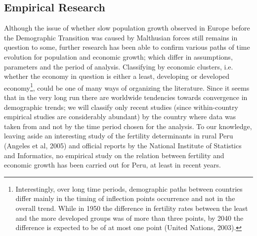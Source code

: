 \documentclass[12pt]{article}%
\begin{document}
\subsection{Empirical Research}
Although the issue of whether slow population growth observed in Europe before the Demographic Transition was caused by Malthusian forces still remains in question to some, further research has been able to confirm various paths of time evolution for population and economic growth; which differ in assumptions, parameters and the period of analysis. Classifying by economic clusters, i.e. whether the economy in question is either a least, developing or developed  economy\footnote{Interestingly, over long time periods, demographic paths between countries differ mainly in the timing of inflection points occurrence and not in the overall trend. While in 1950 the difference in fertility rates between the least and the more developed groups was of more than three points, by 2040 the difference is expected to be of at most one point (United Nations, 2003).}, could be one of many ways of organizing the literature. Since it seems that in the very long run there are worldwide tendencies towards convergence in demographic trends; we will classify only recent studies (since within-country empirical studies are considerably abundant) by the country where data was taken from and not by the time period chosen for the analysis. To our knowledge, leaving aside an interesting study of the fertility determinants in rural Peru (Angeles et al, 2005) and official reports by the National Institute of Statistics and Informatics, no empirical study on the relation between fertility and economic growth has been carried out for Peru, at least in recent years.
\end{document}
